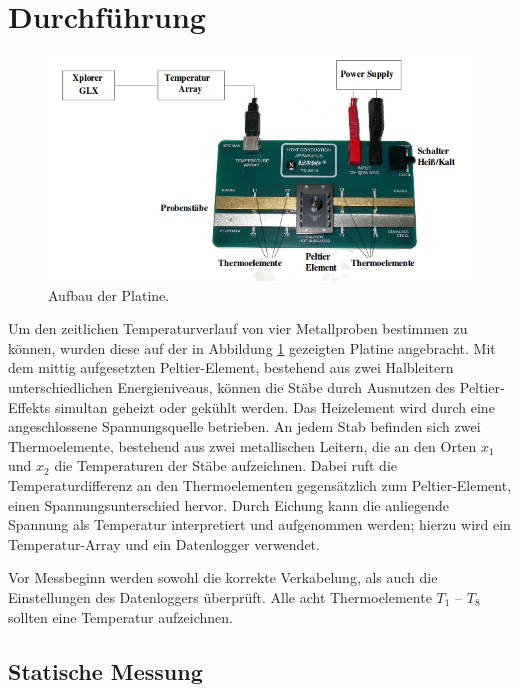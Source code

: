 \newpage
\section{Durchführung}
\label{sec:Durchfuehrung}
\begin{figure}
	\centering
	\includegraphics[width=\textwidth]{Bilder/Aufbau.png}
	\caption{Aufbau der Platine.}
\label{fig:platine}
\end{figure}
Um den zeitlichen Temperaturverlauf von vier Metallproben bestimmen zu können, wurden diese auf der in Abbildung \ref{fig:platine} gezeigten Platine angebracht. 
Mit dem mittig aufgesetzten Peltier-Element, bestehend aus zwei Halbleitern unterschiedlichen Energieniveaus, können die Stäbe durch Ausnutzen des Peltier-Effekts simultan geheizt oder gekühlt werden. 
Das Heizelement wird durch eine angeschlossene Spannungsquelle betrieben. 
An jedem Stab befinden sich zwei Thermoelemente, bestehend aus zwei metallischen Leitern, die an den Orten $x_1$ und $x_2$ die Temperaturen der Stäbe aufzeichnen. 
Dabei ruft die Temperaturdifferenz an den Thermoelementen gegensätzlich zum Peltier-Element, einen Spannungsunterschied hervor.
Durch Eichung kann die anliegende Spannung als Temperatur interpretiert und aufgenommen werden; hierzu wird ein Temperatur-Array und ein 
Datenlogger verwendet.

Vor Messbeginn werden sowohl die korrekte Verkabelung, als auch die Einstellungen des Datenloggers überprüft.
Alle acht Thermoelemente $T_\mathup{1}$ -- $T_\mathup{8}$ sollten eine Temperatur aufzeichnen.

\subsection{Statische Messung}

